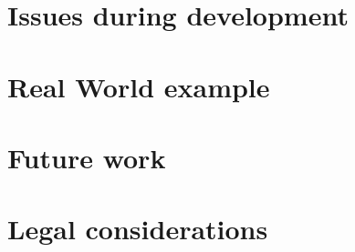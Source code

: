 \documentclass[11pt,a4paper,titlepage]{article}
\begin{document}
    \section{Issues during development}
    \section{Real World example}
    \section{Future work}
    \section{Legal considerations}
    
    
	\newpage
    
	
    
    
\end{document}
